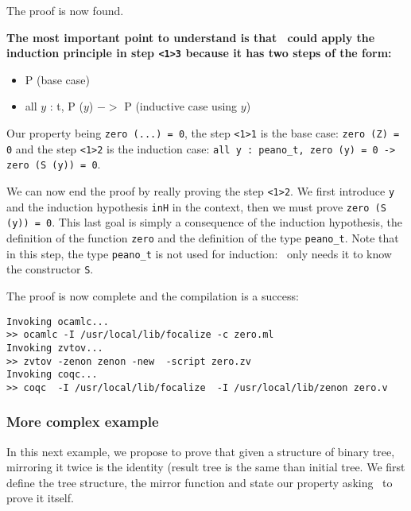 \documentclass[11pt,a4paper,twoside,onecolumn,fullpage]{article}
\begin{document}
{\scriptsize
}

The proof is now found. {\bf The most important point to understand is that
\zenon\ could apply the induction principle in step \lstinline"<1>3"
because it has two steps of the form:
\begin{itemize}
\item P (base case)
\item all $y$ : t, P ($y$) $->$ P (inductive case using $y$)
\end{itemize}
}

Our property being \lstinline"zero (...) = 0", the step \lstinline"<1>1"
is the base case: \lstinline"zero (Z) = 0" and the step \lstinline"<1>2"
is the induction case:
\lstinline"all y : peano_t, zero (y) = 0 -> zero (S (y)) = 0".

We can now end the proof by really proving the step \lstinline"<1>2". We
first introduce \lstinline"y" and the induction hypothesis \lstinline"inH"
in the context, then we must prove \lstinline"zero (S (y)) = 0". This last
goal is simply a consequence of the induction hypothesis, the definition of
the function \lstinline"zero" and the definition of the type
\lstinline"peano_t". Note that in this step, the type \lstinline"peano_t"
is not used for induction: \zenon\ only needs it to know the constructor
\lstinline"S".

{\scriptsize
}

The proof is now complete and the compilation is a success:

{\scriptsize
\begin{verbatim}
Invoking ocamlc...
>> ocamlc -I /usr/local/lib/focalize -c zero.ml
Invoking zvtov...
>> zvtov -zenon zenon -new  -script zero.zv
Invoking coqc...
>> coqc  -I /usr/local/lib/focalize  -I /usr/local/lib/zenon zero.v
\end{verbatim}}


\subsubsection{More complex example}
In this next example, we propose to prove that given a structure of binary
tree, mirroring it twice is the identity (result tree is the same than
initial tree. We first define the tree structure, the mirror function
and state our property asking \zenon\ to prove it itself.

{\scriptsize
}
\end{document}
